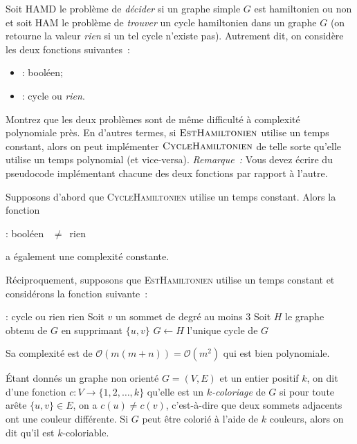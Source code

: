 \documentclass[12pt,addpoints]{exam}
\newcommand{\bigo}{\mathcal{O}}
\begin{document}
\begin{questions}
Soit HAMD le problème de \emph{décider} si un graphe simple $G$ est hamiltonien ou non et soit HAM le problème de \emph{trouver} un cycle hamiltonien dans un graphe $G$ (on retourne la valeur \emph{rien} si un tel cycle n'existe pas). Autrement dit, on considère les deux fonctions suivantes~:
\begin{itemize}
  \item {} : booléen;
  \item {} : cycle ou \emph{rien}.
\end{itemize}
Montrez que les deux problèmes sont de même difficulté à complexité polynomiale près. En d'autres termes, si $\textsc{EstHamiltonien}$ utilise un temps constant, alors on peut implémenter $\textsc{CycleHamiltonien}$ de telle sorte qu'elle utilise un temps polynomial (et vice-versa). \emph{Remarque~:} Vous devez écrire du pseudocode implémentant chacune des deux fonctions par rapport à l'autre.
\begin{solution}
Supposons d'abord que \textsc{CycleHamiltonien} utilise un temps constant. Alors la fonction
\begin{algorithmic}[1]
   : booléen
    \State \Return {}~$\neq$~rien
  \EndFunction
\end{algorithmic}
a également une complexité constante.

Réciproquement, supposons que \textsc{EstHamiltonien} utilise un temps constant et considérons la fonction suivante~:
\begin{algorithmic}[1]
   : cycle ou rien
      \State \Return rien
    \Else
        \State Soit $v$ un sommet de degré au moins $3$
          \State Soit $H$ le graphe obtenu de $G$ en supprimant $\{u,v\}$
            \State $G \leftarrow H$
          \EndIf
        \EndFor
      \EndWhile
      \State \Return l'unique cycle de $G$
    \EndIf
  \EndFunction
\end{algorithmic}
Sa complexité est de $\bigo(m(m + n)) = \bigo(m^2)$ qui est bien polynomiale.
\end{solution}

\question\label{Q:kparti}
Étant donnés un graphe non orienté $G = (V,E)$ et un entier positif $k$, on dit d'une fonction $c : V \rightarrow \{1,2,\ldots,k\}$ qu'elle est un \emph{$k$-coloriage} de $G$ si pour toute arête $\{u,v\} \in E$, on a $c(u) \neq c(v)$, c'est-à-dire que deux sommets adjacents ont une couleur différente. Si $G$ peut être colorié à l'aide de $k$ couleurs, alors on dit qu'il est $k$-coloriable.


\end{questions}
\end{document}
